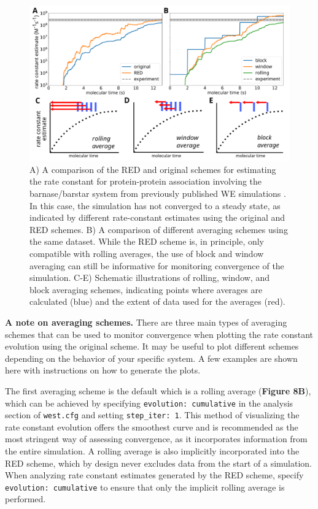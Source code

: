 \begin{figure}[t]
\centering
\includegraphics[width=\columnwidth]{figures/Figure8_analysis.pdf}
\caption{A) A comparison of the RED and original schemes for estimating the rate constant for protein-protein association involving the barnase/barstar system from previously published WE simulations \citep{saglam_proteinprotein_2019}.
In this case, the simulation has not converged to a steady state, as indicated by different rate-constant estimates using the original and RED schemes.
B) A comparison of different averaging schemes using the same dataset.
While the RED scheme is, in principle, only compatible with rolling averages, the use of block and window averaging can still be informative for monitoring convergence of the simulation.
C-E) Schematic illustrations of rolling, window, and block averaging schemes, indicating points where averages are calculated (blue) and the extent of data used for the averages (red).}
\end{figure}

\textbf{A note on averaging schemes.} 
There are three main types of averaging schemes that can be used to monitor convergence when plotting the rate constant evolution using the original scheme.
It may be useful to plot different schemes depending on the behavior of your specific system.
A few examples are shown here with instructions on how to generate the plots.

The first averaging scheme is the default which is a rolling average (\textbf{Figure 8B}), which can be achieved by specifying \verb|evolution: cumulative| in the analysis section of \verb|west.cfg| and setting \verb|step_iter: 1|.
This method of visualizing the rate constant evolution offers the smoothest curve and is recommended as the most stringent way of assessing convergence, as it incorporates information from the entire simulation.
A rolling average is also implicitly incorporated into the RED scheme, which by design never excludes data from the start of a simulation.
When analyzing rate constant estimates generated by the RED scheme, specify \verb|evolution: cumulative| to ensure that only the implicit rolling average is performed.

